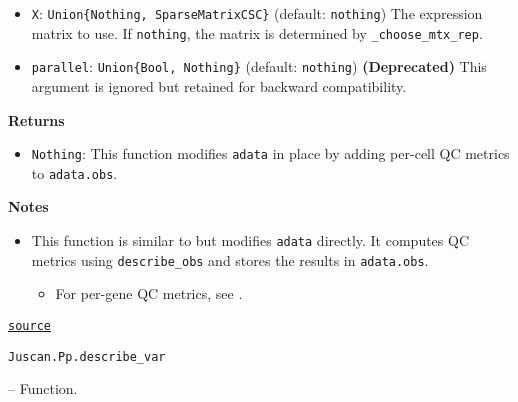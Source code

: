 \documentclass[oneside]{memoir}
\begin{document}
\begin{adjustwidth}{2em}{0pt}
\begin{itemize}
\item \texttt{X}: \texttt{Union\{Nothing, SparseMatrixCSC\}} (default: \texttt{nothing})   The expression matrix to use. If \texttt{nothing}, the matrix is determined by \texttt{\_choose\_mtx\_rep}.


\item \texttt{parallel}: \texttt{Union\{Bool, Nothing\}} (default: \texttt{nothing})   \textbf{(Deprecated)} This argument is ignored but retained for backward compatibility.

\end{itemize}
\textbf{Returns}

\begin{itemize}
\item \texttt{Nothing}:   This function modifies \texttt{adata} in place by adding per-cell QC metrics to \texttt{adata.obs}.

\end{itemize}
\textbf{Notes}

\begin{itemize}
\item This function is similar to  but modifies \texttt{adata} directly.   It computes QC metrics using \texttt{describe\_obs} and stores the results in \texttt{adata.obs}.  

\begin{itemize}
\item For per-gene QC metrics, see .

\end{itemize}
\end{itemize}


\href{https://github.com/zehua0417/Juscan.jl/blob/393ad1b827b678ea98a738f92af658ee9ed9a403/src/preprocessing/qc.jl#L306-L343}{\texttt{source}}


\end{adjustwidth}
\hypertarget{17037237803751367329}{\texttt{Juscan.Pp.describe\_var}}  -- {Function.}
\end{document}
